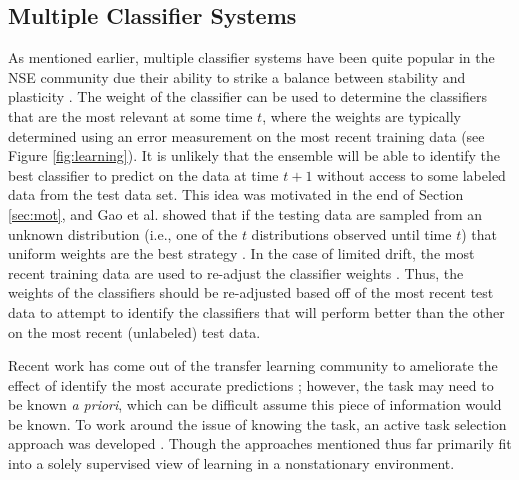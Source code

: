 \documentclass[10pt, conference]{IEEEtran}
\begin{document}
\subsection{Multiple Classifier Systems}
As mentioned earlier, multiple classifier systems have been quite popular in the NSE community due their ability to strike a balance between stability and plasticity \cite{Ditzler2013TKDE, Minku2012TKDE, Kuncheva2004MCS}. The weight of the classifier can be used to determine the classifiers that are the most relevant at some time $t$, where the weights are typically determined using an error measurement on the most recent training data (see Figure \ref{fig:learning}).  
It is unlikely that the ensemble will be able to identify the best classifier to predict on the data at time $t+1$ without access to some labeled data from the test data set. 
This idea was motivated in the end of Section \ref{sec:mot}, and Gao et al. showed that if the testing data are sampled from an unknown distribution (i.e., one of the $t$ distributions observed until time $t$) that uniform weights are the best strategy \cite{Gao2007IEEEICDM, Gao2007SIAMICDM, Gao2008IC}. 
In the case of limited drift, the most recent training data are used to re-adjust the classifier weights \cite{Ditzler2013TKDE, Elwell2011TNN, Tsymbal2008IF}. Thus, the weights of the classifiers should be re-adjusted based off of the most recent test data to attempt to identify the classifiers that will perform better than the other on the most recent (unlabeled) test data. 

Recent work has come out of the transfer learning community to ameliorate the effect of identify the most accurate predictions \cite{Ruvolo2013ICML}; however, the task may need to be known {\em a priori}, which can be difficult assume this piece of information would be known. To work around the issue of knowing the task, an active task selection approach was developed \cite{Ruvolo2013AAAI, Ammar2015ICML}. Though the approaches mentioned thus far primarily fit into a solely supervised view of learning in a nonstationary environment. 
\end{document}
